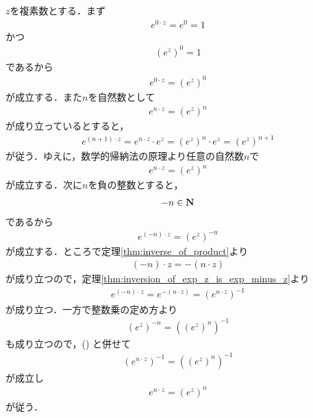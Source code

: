 	\begin{sketch}
		$z$を複素数とする．まず
		\begin{align}
			e^{0 \cdot z} = e^0 = 1
		\end{align}
		かつ
		\begin{align}
			(e^z)^0 = 1
		\end{align}
		であるから
		\begin{align}
			e^{0 \cdot z} = (e^z)^0
		\end{align}
		が成立する．また$n$を自然数として
		\begin{align}
			e^{n \cdot z} = (e^z)^n
		\end{align}
		が成り立っているとすると，
		\begin{align}
			e^{(n+1) \cdot z}
			= e^{n \cdot z} \cdot e^z
			= (e^z)^n \cdot e^z
			= (e^z)^{n+1}
		\end{align}
		が従う．ゆえに，数学的帰納法の原理より任意の自然数$n$で
		\begin{align}
			e^{n \cdot z} = (e^z)^n
		\end{align}
		が成立する．次に$n$を負の整数とすると，
		\begin{align}
			-n \in \mathbf{N}
		\end{align}
		であるから
		\begin{align}
			e^{(-n) \cdot z} = (e^z)^{-n}
			\label{fom:thm_integer_exponentiation_of_exponential_function}
		\end{align}
		が成立する．ところで定理\ref{thm:inverse_of_product}より
		\begin{align}
			(-n) \cdot z = -(n \cdot z)
		\end{align}
		が成り立つので，定理\ref{thm:inversion_of_exp_z_is_exp_minus_z}より
		\begin{align}
			e^{(-n) \cdot z} = e^{-(n \cdot z)} = (e^{n \cdot z})^{-1}
		\end{align}
		が成り立つ．一方で整数乗の定め方より
		\begin{align}
			(e^z)^{-n} = ((e^z)^n)^{-1}
		\end{align}
		も成り立つので，()
		と併せて
		\begin{align}
			(e^{n \cdot z})^{-1} = ((e^z)^n)^{-1}
		\end{align}
		が成立し
		\begin{align}
			e^{n \cdot z} = (e^z)^n
		\end{align}
		が従う．
		\QED
	\end{sketch}
	
